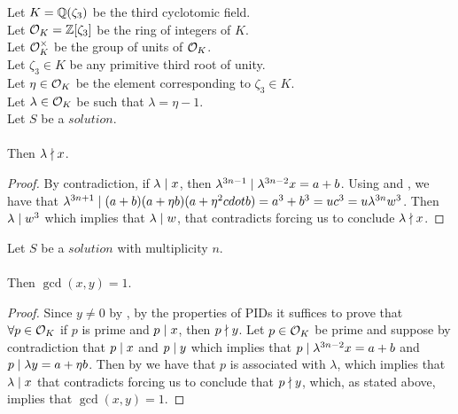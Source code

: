 \begin{lemma}
    \label{lmm:lambda_not_dvd_x}
    \leanok
    Let $K = \mathbb{Q}(\zeta_3)$ be the third cyclotomic field. \\
    Let $\mathcal{O}_K = \mathbb{Z}[\zeta_3]$ be the ring of integers of $K$. \\
    Let $\mathcal{O}^\times_K$ be the group of units of $\mathcal{O}_K$. \\
    Let $\zeta_3 \in K$ be any primitive third root of unity. \\
    Let $\eta \in \mathcal{O}_K$ be the element corresponding to $\zeta_3 \in K$. \\
    Let $\lambda \in \mathcal{O}_K$ be such that $\lambda = \eta -1$. \\
    Let $S$ be a $solution$.\\\\
    Then $\lambda \nmid x$.
\end{lemma}
\begin{proof}
    \leanok
    By contradiction, if $\lambda \mid x$, then
    $\lambda^{3n-1} \mid \lambda^{3n-2}  x = a+b$. Using 
    and , we have that $\lambda^{3n+1} \mid
    (a+b)  (a + \eta  b)  (a + \eta^2 cdot b) = a^3+b^3
    = u c^3 = u \lambda^{3n} w^3$.
    Then $\lambda \mid w^3$ which implies that $\lambda \mid w$, that
    contradicts  forcing us to conclude $\lambda \nmid x$.
\end{proof}

\begin{lemma}
    \label{lmm:coprime_x_y}
    \leanok
    Let $S$ be a $solution$ with multiplicity $n$.\\\\
    Then $\gcd(x,y) = 1$.
\end{lemma}
\begin{proof}
    \leanok
    Since $y \neq 0$ by , by the properties of PIDs it suffices to prove that
    $\forall p \in \mathcal{O}_K$ if $p$ is prime and $p \mid x$, then $p \nmid y$.
    Let $p \in \mathcal{O}_K$ be prime and suppose by contradiction that $p \mid x$ and $p \mid y$
    which implies that $p \mid \lambda^{3n-2} x = a+b$ and $p \mid \lambda y = a + \eta b$.
    Then by 
    we have that $p$ is associated with $\lambda$, which implies that $\lambda \mid x$
    that contradicts  forcing us to conclude that $p \nmid y$, which,
    as stated above, implies that $\gcd(x,y)=1$.
\end{proof}

